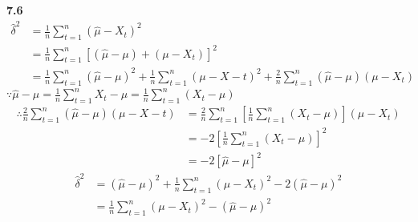 \noindent\textbf{7.6}
    \begin{align*}
    \hat{\delta}^2 &=\frac{1}{n}\sum^{n}_{t=1}(\hat{\mu}-X_t)^2\\
    &=\frac{1}{n}\sum^{n}_{t=1}[(\hat{\mu}-\mu)+(\mu-X_t)]^2\\
    &=\frac{1}{n}\sum^{n}_{t=1}(\hat{\mu}-\mu)^2+\frac{1}{n}\sum^{n}_{t=1}(\mu-X-t)^2+\frac{2}{n}\sum^{n}_{t=1}(\hat{\mu}-\mu)(\mu-X_t)
    \end{align*}
    $\because\hat{\mu}-\mu=\frac{1}{n}\sum^{n}_{t=1}X_t-\mu=\frac{1}{n}\sum^{n}_{t=1}(X_t-\mu)$
    \begin{align*}
    \therefore\frac{2}{n}\sum^{n}_{t=1}(\hat{\mu}-\mu)(\mu-X-t) &=\frac{2}{n}\sum^{n}_{t=1}[\frac{1}{n}\sum^{n}_{t=1}(X_t-\mu)](\mu-X_t)\\
    &=-2[\frac{1}{n}\sum^{n}_{t=1}(X_t-\mu)]^2\\
    &=-2[\hat{\mu}-\mu]^2
    \end{align*}
    \begin{align*}
    \hat{\delta}^2 &=(\hat{\mu}-\mu)^2+\frac{1}{n}\sum^{n}_{t=1}(\mu-X_t)^2-2(\hat{\mu}-\mu)^2\\
    &=\frac{1}{n}\sum^{n}_{t=1}(\mu-X_t)^2-(\hat{\mu}-\mu)^2
    \end{align*}
    
    
